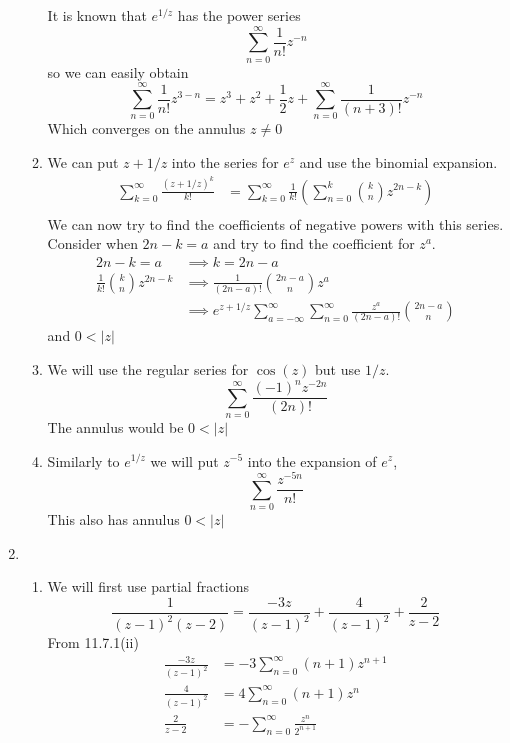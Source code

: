 \documentclass{article}
\begin{document}
\begin{enumerate}
\begin{enumerate}[label=(\roman*)]
          It is known that $e^{1/z}$ has the power series
          \[\sum_{n=0}^\infty\frac{1}{n!}z^{-n}\]
          so we can easily obtain
          \[\sum_{n=0}^\infty\frac{1}{n!}z^{3-n}=z^3+z^2+\frac{1}{2}z+\sum_{n=0}^\infty\frac{1}{(n+3)!}z^{-n}\]
          Which converges on the annulus $z\neq0$
        \item
          We can put $z+1/z$ into the series for $e^z$ and use the binomial expansion.
          \begin{align*}
            \sum_{k=0}^\infty\frac{(z+1/z)^k}{k!}
            &=\sum_{k=0}^\infty\frac{1}{k!}\left(\sum_{n=0}^k
              \binom{k}{n}z^{2n-k}\right)\\
          \end{align*}
          We can now try to find the coefficients of negative powers with this series. Consider when $2n-k=a$ and try to find the coefficient for $z^{a}$.
          \begin{align*}
            2n-k=a&\implies k=2n-a\\
            \frac{1}{k!}\binom{k}{n}z^{2n-k}&\implies\frac{1}{(2n-a)!}\binom{2n-a}{n}z^{a}\\
            &\implies e^{z+1/z}\sum_{a=-\infty}^\infty\sum_{n=0}^\infty\frac{z^a}{(2n-a)!}\binom{2n-a}{n}
          \end{align*}
          and $0<|z|$
        \item
          We will use the regular series for $\cos(z)$ but use $1/z$.
          \[\sum_{n=0}^\infty\frac{(-1)^nz^{-2n}}{(2n)!}\]
          The annulus would be $0<|z|$
        \item
          Similarly to $e^{1/z}$ we will put $z^{-5}$ into the expansion of $e^z$,
          \[\sum_{n=0}^\infty\frac{z^{-5n}}{n!}\]
          This also has annulus $0<|z|$
      \end{enumerate}
    \item
      \begin{enumerate}[label=(\roman*)]
        \item
          We will first use partial fractions
          \[\frac{1}{(z-1)^2(z-2)}=\frac{-3z}{(z-1)^2}+\frac{4}{(z-1)^2}+\frac{2}{z-2}\]
          From 11.7.1(ii)
          \begin{align*}
            \frac{-3z}{(z-1)^2}&=-3\sum_{n=0}^\infty (n+1)z^{n+1}\\
            \frac{4}{(z-1)^2}&=4\sum_{n=0}^\infty (n+1)z^n\\
            \frac{2}{z-2}&=-\sum_{n=0}^\infty\frac{z^n}{2^{n+1}}\\

\end{align*}
\end{enumerate}
\end{enumerate}
\end{document}
